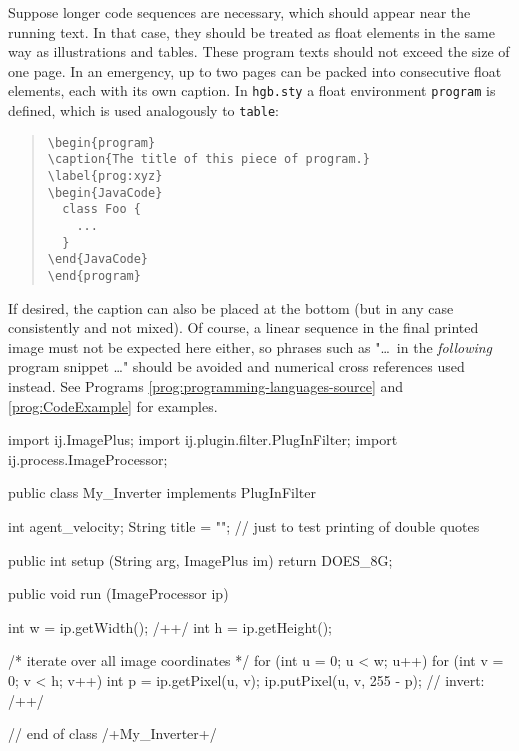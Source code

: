 Suppose longer code sequences are necessary, which should appear near the
running text. In that case, they should be treated as float elements in the same
way as illustrations and tables. These program texts should not exceed the size
of one page. In an emergency, up to two pages can be packed into consecutive
float elements, each with its own caption. In \texttt{hgb.sty} a float
environment \texttt{program} is defined, which is used analogously to
\texttt{table}:
%
\begin{quote}
    \begin{verbatim}
\begin{program}
\caption{The title of this piece of program.}
\label{prog:xyz}
\begin{JavaCode}
  class Foo {
    ...
  }
\end{JavaCode}
\end{program}
    \end{verbatim}
\end{quote}
%
If desired, the caption can also be placed at the bottom (but in any case
consistently and not mixed). Of course, a linear sequence in the final
printed image must not be expected here either, so phrases such as "\ldots\
in the \emph{following} program snippet \ldots" should be avoided and
numerical cross references used instead. See Programs
\ref{prog:programming-languages-source} and \ref{prog:CodeExample} for examples.


\begin{program}
\caption{Example of a program listing (Java) as a float element.}
\label{prog:CodeExample}
\begin{JavaCode}
import ij.ImagePlus;
import ij.plugin.filter.PlugInFilter;
import ij.process.ImageProcessor;

public class My_Inverter implements PlugInFilter {
    int agent_velocity;
    String title = ""; // just to test printing of double quotes

    public int setup (String arg, ImagePlus im) {
        return DOES_8G;
    }

    public void run (ImageProcessor ip) {
        int w = ip.getWidth(); /+\label{ExampleCodeLabel}+/
        int h = ip.getHeight();

        /* iterate over all image coordinates */
        for (int u = 0; u < w; u++) {
            for (int v = 0; v < h; v++) {
                int p = ip.getPixel(u, v);
                ip.putPixel(u, v, 255 - p); // invert: /+\label{MathInCode}+/
            }
        }
    }
} // end of class /+My\_Inverter+/
\end{JavaCode}
%
\end{program}

